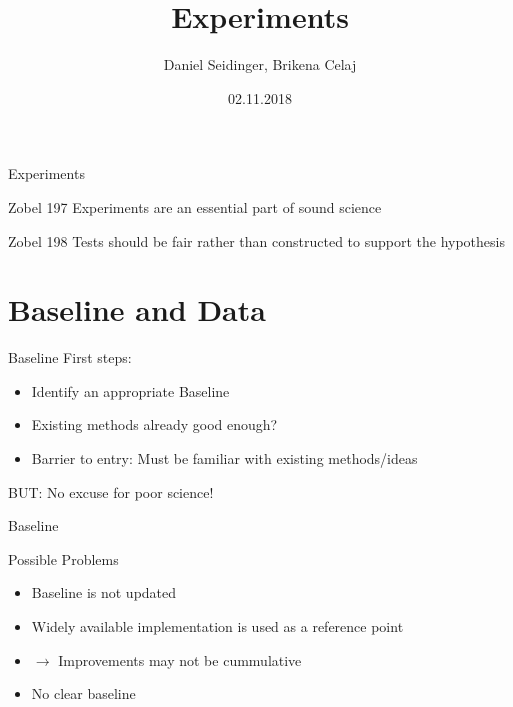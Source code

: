 \documentclass{beamer}
\title{Experiments}
\author{Daniel Seidinger, Brikena Celaj}
\date{02.11.2018}
\begin{document}
\begin{frame}
  \titlepage
\end{frame}

\begin{frame}{Experiments}
\begin{block}{Zobel 197}
Experiments are an essential part of sound science
\end{block}

\begin{block}{ Zobel 198}
Tests should be fair rather than constructed to support the hypothesis
\end{block}
\end{frame}

\section{Baseline and Data}
\begin{frame}{Baseline}
First steps:
\begin{itemize}
\item Identify an appropriate Baseline
\item Existing methods already good enough?
\item Barrier to entry: Must be familiar with existing methods/ideas 
\end{itemize}
BUT: No excuse for poor science!
\end{frame}

\begin{frame}{Baseline}
\begin{alertblock}{Possible Problems}
\begin{itemize}
\item Baseline is not updated 
\item Widely available implementation is used as a reference point
\item[] $\rightarrow$ Improvements may not be cummulative
\item No clear baseline
\end{itemize}
\end{alertblock}
\end{frame}
\end{document}
